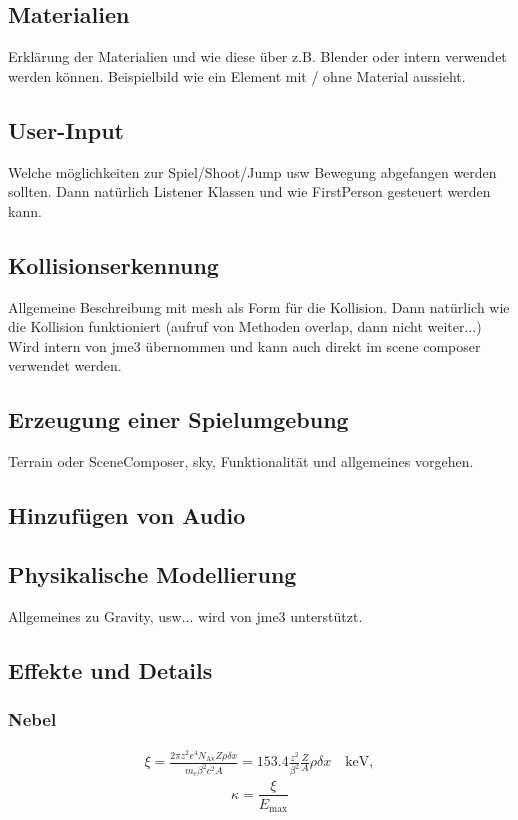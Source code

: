 \subsection{Materialien}
Erklärung der Materialien und wie diese über z.B. Blender oder intern verwendet werden können.
Beispielbild wie ein Element mit / ohne Material aussieht.

\subsection{User-Input}
Welche möglichkeiten zur Spiel/Shoot/Jump usw Bewegung abgefangen werden sollten.
Dann natürlich Listener Klassen und wie FirstPerson gesteuert werden kann.

\subsection{Kollisionserkennung}
Allgemeine Beschreibung mit mesh als Form für die Kollision. Dann natürlich wie die Kollision funktioniert (aufruf von Methoden overlap, dann nicht weiter...)
Wird intern von jme3 übernommen und kann auch direkt im scene composer verwendet werden.

\subsection{Erzeugung einer Spielumgebung}
Terrain oder SceneComposer, sky, 
Funktionalität und allgemeines vorgehen.

\subsection{Hinzufügen von Audio}

\subsection{Physikalische Modellierung}
Allgemeines zu Gravity, usw... wird von jme3 unterstützt.

\subsection{Effekte und Details}

\subsubsection{Nebel}
\begin{eqnarray*} \xi  = \frac{2\pi z^2 e^4 N_{\textrm{Av}} Z \rho
		\delta x}{m_{\textrm{e}} \beta^2 c^2 A} =  153.4 \frac{z^2}{\beta^2}
	\frac{Z}{A}
	\rho \delta x \quad\textrm{keV},
\end{eqnarray*}
\bigskip
\begin{equation}
\kappa =\frac{\xi}{E_{\textrm{max}}} %
\end{equation}


